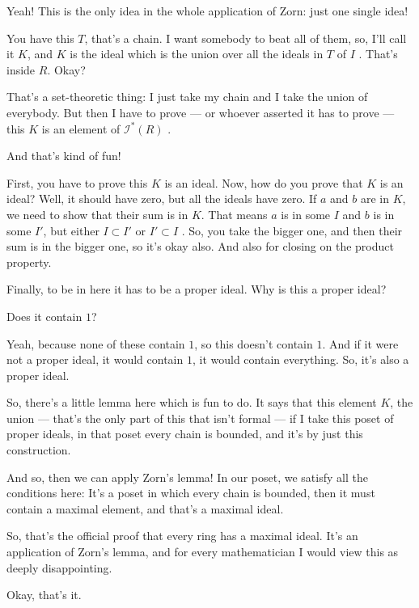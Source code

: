 \begin{speech}[00:42:54 - 00:44:24]
Yeah! This is the only idea in the whole application of Zorn: just one single idea!

You have this $T$, that's a chain. I want somebody to beat all of them, so, I'll call it $K$, and $K$ is the ideal which is the union over all the ideals in $T$ of $I$ . That's inside $R$. Okay?

That's a set-theoretic thing: I just take my chain and I take the union of everybody. But then I have to prove --- or whoever asserted it has to prove --- this $K$ is an element of $\mathscr{I}^*(R)$ .

And that's kind of fun!

First, you have to prove this $K$ is an ideal. Now, how do you prove that $K$ is an ideal? Well, it should have zero, but all the ideals have zero. If $a$ and $b$ are in $K$, we need to show that their sum is in $K$. That means $a$ is in some $I$ and $b$ is in some $I'$, but either $I \subset I'$ or $I' \subset I$ . So, you take the bigger one, and then their sum is in the bigger one, so it's okay also. And also for closing on the product property.

Finally, to be in here it has to be a proper ideal. Why is this a proper ideal?
\end{speech}

\begin{student}
Does it contain $1$?
\end{student}

\begin{speech}[00:44:26 - 00:45:20]
Yeah, because none of these contain $1$, so this doesn't contain $1$. And if it were not a proper ideal, it would contain $1$, it would contain everything. So, it's also a proper ideal.

So, there's a little lemma here which is fun to do. It says that this element $K$, the union --- that's the only part of this that isn't formal --- if I take this poset of proper ideals, in that poset every chain is bounded, and it's by just this construction.

And so, then we can apply Zorn's lemma! In our poset, we satisfy all the conditions here: It's a poset in which every chain is bounded, then it must contain a maximal element, and that's a maximal ideal.

So, that's the official proof that every ring has a maximal ideal. It's an application of Zorn's lemma, and for every mathematician I would view this as deeply disappointing.

Okay, that's it.
\end{speech}

